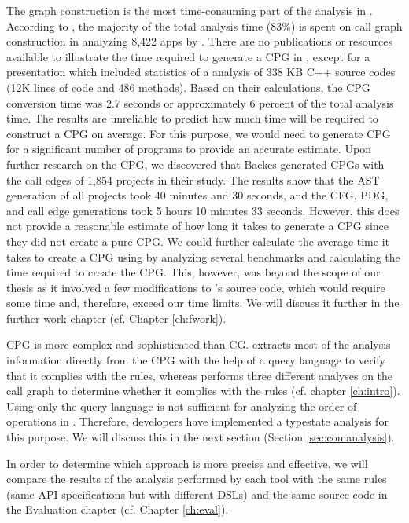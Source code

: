 The graph construction is the most time-consuming part of the analysis in \cognicryptsast. According to \cite{skm19}, the majority of the total analysis time (83\%) is spent on call graph construction in analyzing 8,422 apps by \cognicryptsast{}. There are no publications or resources available to illustrate the time required to generate a CPG in \codyze{}, except for a presentation \cite{presentationcodyze} which included statistics of a \codyze{} analysis of 338 KB C++ source codes (12K lines of code and 486 methods). Based on their calculations, the CPG conversion time was 2.7 seconds or approximately 6 percent of the total analysis time. The results are unreliable to predict how much time will be required to construct a CPG on average. For this purpose, we would need to generate CPG for a significant number of programs to provide an accurate estimate. Upon further research on the CPG, we discovered that Backes \etal{} \cite{cpgphp} generated CPGs with the call edges of 1,854 projects in their study. The results show that the AST generation of all projects took 40 minutes and 30 seconds, and the CFG, PDG, and call edge generations took 5 hours 10 minutes 33 seconds. However, this does not provide a reasonable estimate of how long it takes to generate a CPG since they did not create a pure CPG. We could further calculate the average time it takes to create a CPG using \codyze{} by analyzing several benchmarks and calculating the time required to create the CPG. This, however, was beyond the scope of our thesis as it involved a few modifications to \codyze's source code, which would require some time and, therefore, exceed our time limits. We will discuss it further in the further work chapter (cf. Chapter \ref{ch:fwork}).

CPG is more complex and sophisticated than CG. \codyze{} extracts most of the analysis information directly from the CPG with the help of a query language to verify that it complies with the \MARK{} rules, whereas \cognicryptsast{} performs three different analyses on the call graph to determine whether it complies with the \crysl{} rules (cf. chapter \ref{ch:intro}). Using only the query language is not sufficient for analyzing the order of operations in \codyze. Therefore, \codyze{} developers have implemented a typestate analysis for this purpose. We will discuss this in the next section (Section \ref{sec:comanalysis}).

In order to determine which approach is more precise and effective, we will compare the results of the analysis performed by each tool with the same rules (same API specifications but with different DSLs) and the same source code in the Evaluation chapter (cf. Chapter \ref{ch:eval}). 

